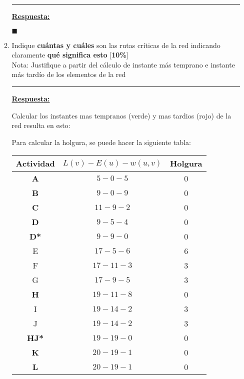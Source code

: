 \documentclass[legalpaper,10pt]{article}
\begin{document}
\begin{enumerate}
\begin{enumerate}
  \rule{5cm}{0.4pt}

  \underline{\textbf{Respuesta:}}

   \hfill \(\blacksquare\)

  \newpage









  \item Indique \textbf{cuántas y cuáles} son las rutas críticas de la red indicando claramente \textbf{qué significa esto} [\textbf{10\%}] \\
  Nota: Justifique a partir del cálculo de instante más temprano e instante más tardío de los elementos de la red

  \rule{5cm}{0.4pt}

  \underline{\textbf{Respuesta:}}

  Calcular los instantes mas tempranos (verde) y mas tardios (rojo) de la red resulta en esto:


  Para calcular la holgura, se puede hacer la siguiente tabla:

  \begin{table}[h]
      \centering
      \begin{tabular}{| c || c | c |}
    \hline
    Actividad & $L(v)-E(u)-w(u,v)$ & Holgura \\
    \hline \hline
    \textbf{A}  & $5-0-5$   &  0    \\ \hline
    \textbf{B}  & $9-0-9$   &  0    \\ \hline
    \textbf{C}  & $11-9-2$  &  0    \\ \hline
    \textbf{D}  & $9-5-4$   &  0    \\ \hline
    \textbf{D*}  & $9-9-0$   &  0    \\ \hline
    E  & $17-5-6$  &  6    \\ \hline
    F  & $17-11-3$ &  3    \\ \hline
    G  & $17-9-5$  &  3    \\ \hline
    \textbf{H}  & $19-11-8$ &  0    \\ \hline
    I  & $19-14-2$ &  3    \\ \hline
    J  & $19-14-2$ &  3    \\ \hline
    \textbf{HJ*}  & $19-19-0$   &  0    \\ \hline
    \textbf{K}  & $20-19-1$ &  0    \\ \hline
    \textbf{L}  & $20-19-1$ &  0    \\
    \hline
      \end{tabular}
  \end{table}


\end{enumerate}
\end{enumerate}
\end{document}
